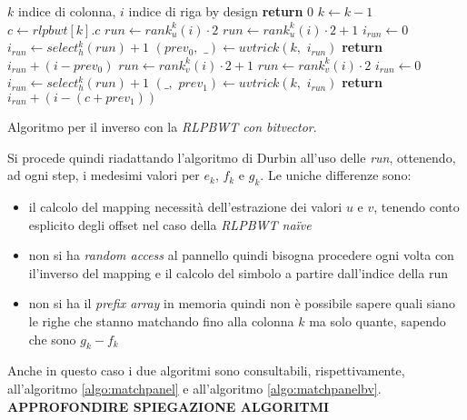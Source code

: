 \begin{algorithm}
  \begin{algorithmic}[1]
    \Comment $k$ indice di colonna, $i$ indice di riga
    \Comment by design
    \State \textbf{return} $0$
    \EndIf
    \State $k\gets k-1$
    \State $c\gets rlpbwt[k].c$
    \State $run\gets rank_u^{k}(i)\cdot 2$
    \Else
    \State $run\gets rank_u^{k}(i)\cdot 2+1$
    \EndIf
    \State $i_{run}\gets 0$
    \State $i_{run}\gets select_h^{k}(run)+1$
    \EndIf
    \State $(prev_0,\,\,\_)\gets uvtrick(k,\,\,i_{run})$
    \State \textbf{return} $i_{run}+(i-prev_0)$
    \Else
    \State $run\gets rank_v^{k}(i)\cdot 2+1$
    \Else
    \State $run\gets rank_v^{k}(i)\cdot 2$
    \EndIf
    \State $i_{run}\gets 0$
    \State $i_{run}\gets select_h^{k}(run)+1$
    \EndIf
    \State $(\_,\,\,prev_1)\gets uvtrick(k,\,\,i_{run})$
    \State \textbf{return} $i_{run}+(i-(c+prev_1))$
    \EndIf
    \EndFunction
  \end{algorithmic}
  \caption{Algoritmo per il inverso con la \textit{RLPBWT con bitvector}.}
  \label{algo:lfrevbv}
\end{algorithm}
Si procede quindi riadattando l'algoritmo di Durbin all'uso delle \textit{run},
ottenendo, ad ogni step, i medesimi valori per $e_k$, $f_k$ e $g_k$. Le uniche
differenze sono:
\begin{itemize}
  \item il calcolo del mapping necessità dell'estrazione dei valori $u$ e $v$,
  tenendo conto esplicito degli offset nel caso della \textit{RLPBWT na\"{i}ve}
  \item non si ha \textit{random access} al pannello quindi bisogna procedere
  ogni volta con il'inverso del mapping e il calcolo del simbolo a partire
  dall'indice della run
  \item non si ha il \textit{prefix array} in memoria quindi non è possibile
  sapere quali siano le righe che stanno matchando fino alla colonna $k$ ma solo
  quante, sapendo che sono $g_k-f_k$
\end{itemize}
Anche in questo caso i due algoritmi sono consultabili, rispettivamente,
all'algoritmo \ref{algo:matchpanel} e all'algoritmo \ref{algo:matchpanelbv}.\\
\textbf{APPROFONDIRE SPIEGAZIONE ALGORITMI}